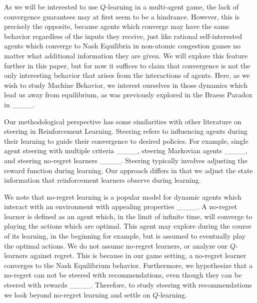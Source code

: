 As we will be interested to use $Q$-learning in a multi-agent game, the lack of convergence guarantees may at first seem to be a hindrance. However, this is precisely the opposite, because agents which converge may have the same behavior regardless of the inputs they receive, just like rational self-interested agents which converge to Nash Equilibria in non-atomic congestion games no matter what additional information they are given. We will explore this feature further in this paper, but for now it suffices to claim that convergence is not the only interesting behavior that arises from the interactions of agents. Here, as we wish to study Machine Behavior, we interest ourselves in those dynamics which lead us away from equilibrium, as was previously explored in the Braess Paradox in ____.

Our methodological perspective has some similarities with other literature on steering in Reinforcement Learning. Steering refers to influencing agents during their learning to guide their convergence to desired policies. For example, single agent steering with multiple criteria ____, steering Markovian agents ____, and  steering no-regret learners ____. Steering typically involves adjusting the reward function during learning. Our approach differs in that we adjust the state information that reinforcement learners observe during learning.

We note that no-regret learning is a popular model for dynamic agents which interact with an environment with appealing properties ____. A no-regret learner is defined as an agent which, in the limit of infinite time, will converge to playing the actions which are optimal. This agent may explore during the course of its learning, in the beginning for example, but is assumed to eventually play the optimal actions. We do not assume no-regret learners, or analyze our $Q$-learners against regret. This is because in our game setting, a no-regret learner converges to the Nash Equilibrium behavior. Furthermore, we hypothesize that a no-regret can not be steered with recommendations, even though they can be steered with rewards ____. Therefore, to study steering with recommendations we look beyond no-regret learning and settle on $Q$-learning.

